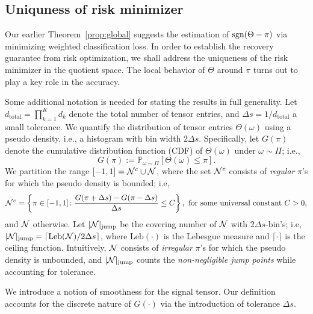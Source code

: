 \documentclass[twoside,11pt]{article}
\theoremstyle{definition}
\def\sign{\textup{sgn}}
\begin{document}
\subsection{Uniquness of risk minimizer}\label{sec:identifiability}
Our earlier Theorem~\ref{prop:global} suggests the estimation of $\sign(\Theta-\pi)$ via minimizing weighted classification loss. In order to establish the recovery guarantee from risk optimization, we shall address the uniqueness of the risk minimizer in the quotient space. The local behavior of $\Theta$ around $\pi$ turns out to play a key role in the accuracy. 

Some additional notation is needed for stating the results in full generality. Let $d_\text{total}=\prod_{k=1}^K d_k$ denote the total number of tensor entries, and $\Delta s = 1/d_\text{total}$ a small tolerance. We quantify the distribution of tensor entries $\Theta(\omega)$ using a pseudo density, i.e., a histogram with bin width $2\Delta s$. Specifically, let $G(\pi)$ denote the cumulative distribution function (CDF) of $\Theta(\omega)$ under $\omega\sim \Pi$; i.e., 
\begin{equation}\label{eq:cdf}
G(\pi):=\mathbb{P}_{\omega\sim \Pi}[\Theta(\omega)\leq \pi].
\end{equation}
We partition the range $[-1,1]=\mathcal{N}^c \cup \mathcal{N}$, where the set $\mathcal{N}^c$ consists of \emph{regular} $\pi$'s for which the pseudo density is bounded; i.e,
\[
\mathcal{N}^c=\left\{\pi\in[-1,1] \colon {G(\pi+{\Delta s})-G(\pi-{\Delta s})\over \Delta s} \leq C \right\},\ \text{for some universal constant $C>0$},
\]
and $\mathcal{N}$ otherwise. Let $|\mathcal{N}|_{\text{jump}}$ be the covering number of $\mathcal{N}$ with 2$\Delta s$-bin's; i.e, $|\mathcal{N}|_{\text{jump}} = \lceil \text{Leb}(\mathcal{N})/2\Delta s \rceil$, where $\text{Leb}(\cdot)$ is the Lebesgue measure and $\lceil \cdot \rceil$ is the ceiling function.  Intuitively, $\mathcal{N}$ consists of \emph{irregular} $\pi$'s for which the pseudo density is unbounded, and $|\mathcal{N}|_{\text{jump}}$ counts the \emph{non-negligible jump points} while accounting for tolerance. 

We introduce a notion of smoothness for the signal tensor. Our definition accounts for the discrete nature of $G(\cdot)$ via the introduction of tolerance $\Delta s$. 
\end{document}
